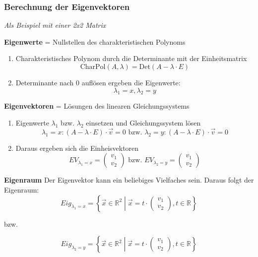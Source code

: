 \subsubsection{Berechnung der Eigenvektoren}
\emph{Als Beispiel mit einer 2x2 Matrix}

\textbf{Eigenwerte} = Nullstellen des charakteristischen Polynoms
\begin{enumerate}
\item Charakteristisches Polynom durch die Determinante mit der Einheitsmatrix \[ \text{CharPol}(A, \lambda) = \text{Det}(A - \lambda \cdot E) \]
\item Determinante nach 0 auflösen ergeben die Eigenwerte: \[ \lambda_1 = x, \lambda_2 = y \]
\end{enumerate}

\textbf{Eigenvektoren} = Lösungen des linearen Gleichungssystems 
\begin{enumerate}
\item Eigenwerte $\lambda_1$ bzw. $\lambda_2$ einsetzen und Gleichungssystem lösen 
\[ \lambda_1 = x: (A - \lambda \cdot E)\cdot \vec{v} = 0 
\text{ bzw. } 
\lambda_2 = y: (A - \lambda \cdot E)\cdot \vec{v} = 0 \]

\item Daraus ergeben sich die Einheisvektoren \[ EV_{\lambda_1 = x} = \begin{pmatrix} v_1 \\ v_2 \end{pmatrix} \text{ bzw. } EV_{\lambda_2 = y} = \begin{pmatrix} v_1 \\ v_2 \end{pmatrix} \]
\end{enumerate}

\textbf{Eigenraum}
Der Eigenvektor kann ein beliebiges Vielfaches sein. Daraus folgt der Eigenraum:
\[ Eig_{\lambda_1 = x} = \left \{
    \vec{x} \in \mathbb{R}^2 \middle |
      \vec{x} = t \cdot \left( \begin {array} {c} v_1 \\ v_2 \end {array} \right),
      t \in \mathbb{R}
\right \} \]
\begin{center} bzw. \end{center}
\[ Eig_{\lambda_2 = y} = \left \{
    \vec{x} \in \mathbb{R}^2 \middle |
      \vec{x} = t \cdot \left( \begin {array} {c} v_1 \\ v_2 \end {array} \right),
      t \in \mathbb{R}
\right \} \]

